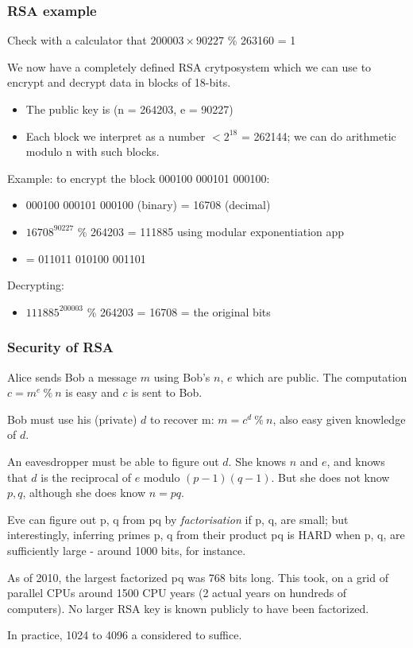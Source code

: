 \documentclass[10pt, hyperref={pdfpagelabels=false}]{beamer}
\begin{document}
\begin{frame}
\frametitle{RSA example}
Check with a calculator that $200003 \times 90227$ \% 263160 = 1

We now have a completely defined RSA crytposystem which we can use to encrypt and decrypt data in blocks of 18-bits.
\begin{itemize}
\item The public key is (n = 264203, e = 90227)
\item Each block we interpret as a number $< 2^{18}$ = 262144; we can do arithmetic modulo n with such blocks.
\end{itemize}

Example: to encrypt the block 000100 000101 000100:
\begin{itemize}
\item 000100 000101 000100 (binary) = 16708 (decimal)
\item $16708^{90227}$ \% 264203 = 111885 using modular exponentiation app
\item = 011011 010100 001101
\end{itemize}

Decrypting:
\begin{itemize}
\item $111885^{200003}$ \% 264203 = 16708 = the original bits
\end{itemize}
\end{frame}

\begin{frame}
\frametitle{Security of RSA}
Alice sends Bob a message $m$ using Bob's $n$, $e$ which are public. The computation $c = m^e~\%~n$ is easy and $c$ is sent to Bob.

Bob must use his (private) $d$ to recover m: $m = c^d~\%~n$, also easy given knowledge of $d$.

An eavesdropper must be able to figure out $d$. She knows $n$ and $e$, and knows that $d$ is the reciprocal of $e$ modulo $(p-1)(q-1)$. But she does not know $p, q$, although she does know $n = pq$.

Eve can figure out p, q from pq by \emph{factorisation} if p, q, are small; but interestingly, inferring primes p, q from their product pq is HARD when p, q, are sufficiently large - around 1000 bits, for instance.

As of 2010, the largest factorized pq was 768 bits long. This took, on a grid of parallel CPUs around 1500 CPU years (2 actual years on hundreds of computers). No larger RSA key is known publicly to have been factorized. 

In practice, 1024 to 4096 a considered to suffice.
\end{frame}
\end{document}
